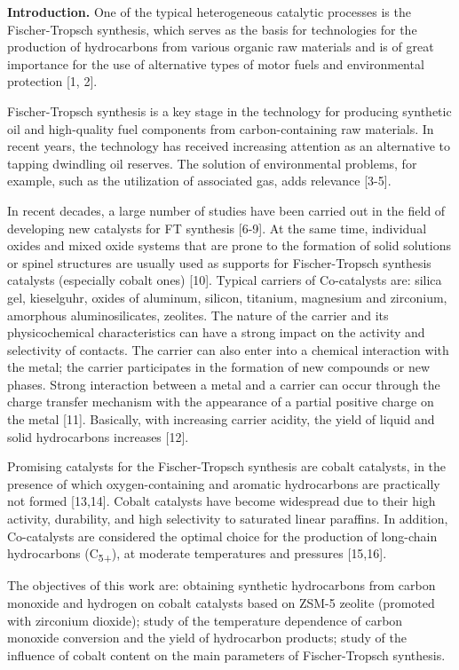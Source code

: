 \begin{multicols}{2}
{\bfseries Introduction.} One of the typical heterogeneous catalytic
processes is the Fischer-Tropsch synthesis, which serves as the basis
for technologies for the production of hydrocarbons from various organic
raw materials and is of great importance for the use of alternative
types of motor fuels and environmental protection {[}1, 2{]}.

Fischer-Tropsch synthesis is a key stage in the technology for producing
synthetic oil and high-quality fuel components from carbon-containing
raw materials. In recent years, the technology has received increasing
attention as an alternative to tapping dwindling oil reserves. The
solution of environmental problems, for example, such as the utilization
of associated gas, adds relevance {[}3-5{]}.

In recent decades, a large number of studies have been carried out in
the field of developing new catalysts for FT synthesis {[}6-9{]}. At the
same time, individual oxides and mixed oxide systems that are prone to
the formation of solid solutions or spinel structures are usually used
as supports for Fischer-Tropsch synthesis catalysts (especially cobalt
ones) {[}10{]}. Typical carriers of Co-catalysts are: silica gel,
kieselguhr, oxides of aluminum, silicon, titanium, magnesium and
zirconium, amorphous aluminosilicates, zeolites. The nature of the
carrier and its physicochemical characteristics can have a strong impact
on the activity and selectivity of contacts. The carrier can also enter
into a chemical interaction with the metal; the carrier participates in
the formation of new compounds or new phases. Strong interaction between
a metal and a carrier can occur through the charge transfer mechanism
with the appearance of a partial positive charge on the metal {[}11{]}.
Basically, with increasing carrier acidity, the yield of liquid and
solid hydrocarbons increases {[}12{]}.

Promising catalysts for the Fischer-Tropsch synthesis are cobalt
catalysts, in the presence of which oxygen-containing and aromatic
hydrocarbons are practically not formed {[}13,14{]}. Cobalt catalysts
have become widespread due to their high activity, durability, and high
selectivity to saturated linear paraffins. In addition, Co-catalysts are
considered the optimal choice for the production of long-chain
hydrocarbons (C\textsubscript{5+}), at moderate temperatures and
pressures {[}15,16{]}.

The objectives of this work are: obtaining synthetic hydrocarbons from
carbon monoxide and hydrogen on cobalt catalysts based on ZSM-5 zeolite
(promoted with zirconium dioxide); study of the temperature dependence
of carbon monoxide conversion and the yield of hydrocarbon products;
study of the influence of cobalt content on the main parameters of
Fischer-Tropsch synthesis.


\end{multicols}
